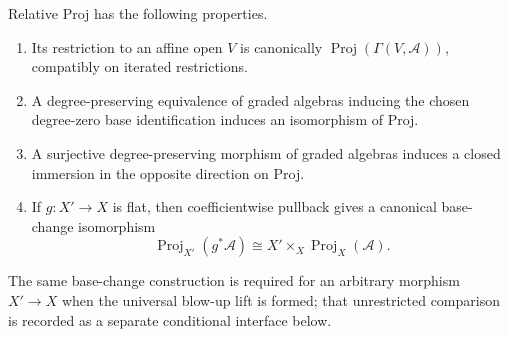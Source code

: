 \begin{proposition}
  \label{prop:nagata-relative-proj-functoriality}

  Relative Proj has the following properties.
  \begin{enumerate}
    \item Its restriction to an affine open $V$ is canonically
      $\operatorname{Proj}(\Gamma(V,\mathcal A))$, compatibly on iterated
      restrictions.
    \item A degree-preserving equivalence of graded algebras inducing the
      chosen degree-zero base identification induces an isomorphism of Proj.
    \item A surjective degree-preserving morphism of graded algebras induces
      a closed immersion in the opposite direction on Proj.
    \item If $g\colon X'\to X$ is flat, then coefficientwise pullback gives a
      canonical base-change isomorphism
      \[
        \operatorname{Proj}_{X'}(g^*\mathcal A)
          \cong X'\times_X\operatorname{Proj}_X(\mathcal A).
       \]
    \end{enumerate}
    The same base-change construction is required for an arbitrary morphism
    $X'\to X$ when the universal blow-up lift is formed; that unrestricted
    comparison is recorded as a separate conditional interface below.
\end{proposition}

